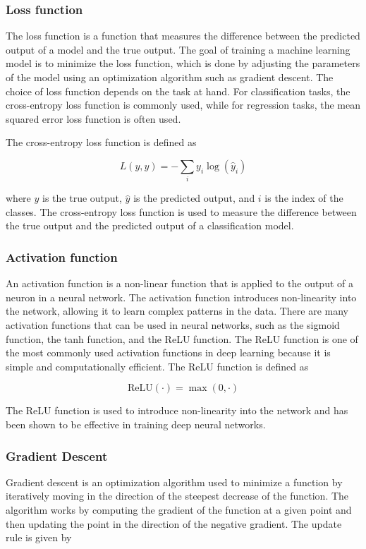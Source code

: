 \documentclass{article}
\begin{document}
\subsubsection{Loss function}
The loss function is a function that measures the difference between the predicted output of a model and the true output. The goal of training a machine learning model is to minimize the loss function, which is done by adjusting the parameters of the model using an optimization algorithm such as gradient descent. The choice of loss function depends on the task at hand. For classification tasks, the cross-entropy loss function is commonly used, while for regression tasks, the mean squared error loss function is often used.

The cross-entropy loss function is defined as 

$$
    L(y, \hat{y}) = -\sum_{i} y_i \log(\hat{y}_i)
$$

where $y$ is the true output, $\hat{y}$ is the predicted output, and $i$ is the index of the classes. The cross-entropy loss function is used to measure the difference between the true output and the predicted output of a classification model.

\subsubsection{Activation function}
An activation function is a non-linear function that is applied to the output of a neuron in a neural network. The activation function introduces non-linearity into the network, allowing it to learn complex patterns in the data. There are many activation functions that can be used in neural networks, such as the sigmoid function, the tanh function, and the ReLU function. The ReLU function is one of the most commonly used activation functions in deep learning because it is simple and computationally efficient. The ReLU function is defined as

$$
    \text{ReLU}(\cdot)=\max(0,\cdot)
$$

The ReLU function is used to introduce non-linearity into the network and has been shown to be effective in training deep neural networks.


\subsubsection{Gradient Descent}
Gradient descent is an optimization algorithm used to minimize a function by iteratively moving in the direction of the steepest decrease of the function. The algorithm works by computing the gradient of the function at a given point and then updating the point in the direction of the negative gradient. The update rule is given by
\end{document}

